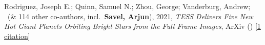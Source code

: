 \item[{\color{numcolor}\scriptsize1}] Rodriguez, Joseph E.; Quinn, Samuel N.; Zhou, George; Vanderburg, Andrew; \etal\ (\& {114} other co-authors, incl.\ \textbf{Savel, Arjun}), 2021, \emph{TESS Delivers Five New Hot Giant Planets Orbiting Bright Stars from the Full Frame Images}, ArXiv () [\href{https://ui.adsabs.harvard.edu/abs/2021arXiv210101726R}{1 citation}]